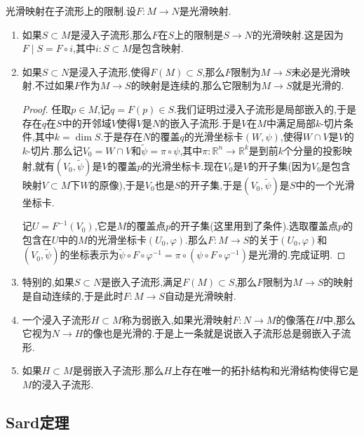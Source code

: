 光滑映射在子流形上的限制.设$F:M\to N$是光滑映射.
\begin{enumerate}
	\item 如果$S\subset M$是浸入子流形,那么$F$在$S$上的限制是$S\to N$的光滑映射.这是因为$F\mid S=F\circ i$,其中$i:S\subset M$是包含映射.
	\item 如果$S\subset N$是浸入子流形,使得$F(M)\subset S$,那么$F$限制为$M\to S$未必是光滑映射.不过如果$F$作为$M\to S$的映射是连续的,那么它限制为$M\to S$就是光滑的.
	\begin{proof}
		
		任取$p\in M$,记$q=F(p)\in S$.我们证明过浸入子流形是局部嵌入的,于是存在$q$在$S$中的开邻域$V$使得$V$是$N$的嵌入子流形.于是$V$在$M$中满足局部$k$-切片条件,其中$k=\dim S$.于是存在$N$的覆盖$q$的光滑坐标卡$(W,\psi)$,使得$W\cap V$是$V$的$k$-切片.那么记$V_0=W\cap V$和$\widetilde{\psi}=\pi\circ\psi$,其中$\pi:\mathbb{R}^n\to\mathbb{R}^k$是到前$k$个分量的投影映射,就有$(V_0,\widetilde{\psi})$是$V$的覆盖$p$的光滑坐标卡.现在$V_0$是$V$的开子集(因为$V_0$是包含映射$V\subset M$下$W$的原像),于是$V_0$也是$S$的开子集,于是$(V_0,\widetilde{\psi})$是$S$中的一个光滑坐标卡.
		
		记$U=F^{-1}(V_0)$,它是$M$的覆盖点$p$的开子集(这里用到了条件).选取覆盖点$p$的包含在$U$中的$M$的光滑坐标卡$(U_0,\varphi)$.那么$F:M\to S$的关于$(U_0,\varphi)$和$(V_0,\widetilde{\psi})$的坐标表示为$\widetilde{\psi}\circ F\circ\varphi^{-1}=\pi\circ(\psi\circ F\circ\varphi^{-1})$是光滑的.完成证明.
	\end{proof}
	\item 特别的,如果$S\subset N$是嵌入子流形,满足$F(M)\subset S$,那么$F$限制为$M\to S$的映射是自动连续的,于是此时$F:M\to S$自动是光滑映射.
	\item 一个浸入子流形$H\subset M$称为弱嵌入,如果光滑映射$F:N\to M$的像落在$H$中,那么它视为$N\to H$的像也是光滑的.于是上一条就是说嵌入子流形总是弱嵌入子流形.
	\item 如果$H\subset M$是弱嵌入子流形,那么$H$上存在唯一的拓扑结构和光滑结构使得它是$M$的浸入子流形.
\end{enumerate}

\subsection{Sard定理}

